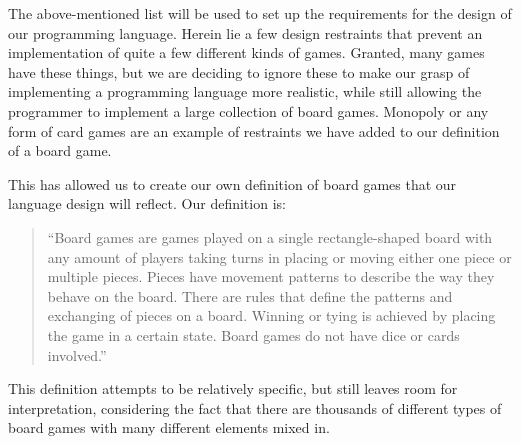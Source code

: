 The above-mentioned list will be used to set up the requirements for the
design of our programming language. Herein lie a few design restraints
that prevent an implementation of quite a few different kinds of games.
Granted, many games have these things, but we are deciding to ignore
these to make our grasp of implementing a programming language more
realistic, while still allowing the programmer to implement a large
collection of board games. Monopoly or any form of card games are an
example of restraints we have added to our definition of a board game.

This has allowed us to create our own definition of board games that our language design will reflect. Our definition is:
\begin{quote}
  ``Board games are games played on a single rectangle-shaped board with any amount of players taking turns in placing or moving either one piece or multiple pieces. Pieces have movement patterns to describe the way they behave on the board. There are rules that define the patterns and exchanging of pieces on a board. Winning or tying is achieved by placing the game in a certain state. Board games do not have dice or cards involved.''
\end{quote}

This definition attempts to be relatively specific, but still leaves
room for interpretation, considering the fact that there are thousands
of different types of board games with many different elements mixed in.
